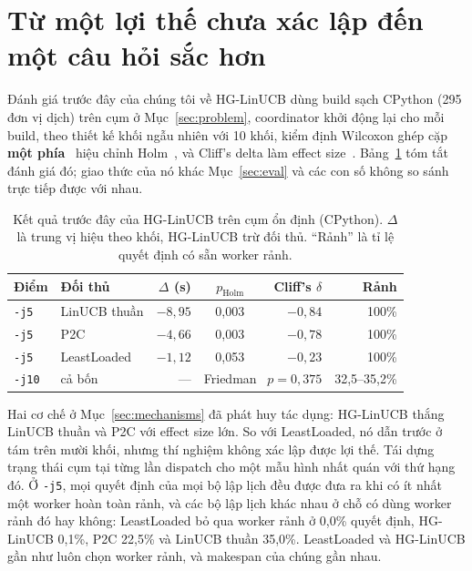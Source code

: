 \documentclass[final,5p,times,twocolumn]{elsarticle}
\begin{document}
\section{Từ một lợi thế chưa xác lập đến một câu hỏi sắc hơn}
\label{sec:question}

Đánh giá trước đây của chúng tôi về HG-LinUCB dùng build sạch CPython (295 đơn vị dịch) trên cụm ở Mục~\ref{sec:problem}, coordinator khởi động lại cho mỗi build, theo thiết kế khối ngẫu nhiên với 10 khối, kiểm định Wilcoxon ghép cặp \textbf{một phía}~\cite{wilcoxon1945} hiệu chỉnh Holm~\cite{holm1979}, và Cliff's delta làm effect size~\cite{cliff1993}. Bảng~\ref{tab:earlier} tóm tắt đánh giá đó; giao thức của nó khác Mục~\ref{sec:eval} và các con số không so sánh trực tiếp được với nhau.

\begin{table}[t]
\centering
\caption{Kết quả trước đây của HG-LinUCB trên cụm ổn định (CPython). $\Delta$ là trung vị hiệu theo khối, HG-LinUCB trừ đối thủ. ``Rảnh'' là tỉ lệ quyết định có sẵn worker rảnh.}
\label{tab:earlier}
\footnotesize
\setlength{\tabcolsep}{3pt}
\begin{tabular}{llrrrr}
\toprule
Điểm & Đối thủ & $\Delta$ (s) & $p_{\text{Holm}}$ & Cliff's $\delta$ & Rảnh \\
\midrule
\texttt{-j5} & LinUCB thuần & $-8{,}95$ & 0,003 & $-0{,}84$ & 100\% \\
\texttt{-j5} & P2C & $-4{,}66$ & 0,003 & $-0{,}78$ & 100\% \\
\texttt{-j5} & LeastLoaded & $-1{,}12$ & 0,053 & $-0{,}23$ & 100\% \\
\texttt{-j10} & cả bốn & --- & \multicolumn{2}{l}{Friedman~\cite{friedman1937} $p=0{,}375$} & 32,5--35,2\% \\
\bottomrule
\end{tabular}
\end{table}

Hai cơ chế ở Mục~\ref{sec:mechanisms} đã phát huy tác dụng: HG-LinUCB thắng LinUCB thuần và P2C với effect size lớn. So với LeastLoaded, nó dẫn trước ở tám trên mười khối, nhưng thí nghiệm không xác lập được lợi thế. Tái dựng trạng thái cụm tại từng lần dispatch cho một mẫu hình nhất quán với thứ hạng đó. Ở \texttt{-j5}, mọi quyết định của mọi bộ lập lịch đều được đưa ra khi có ít nhất một worker hoàn toàn rảnh, và các bộ lập lịch khác nhau ở chỗ có dùng worker rảnh đó hay không: LeastLoaded bỏ qua worker rảnh ở 0,0\% quyết định, HG-LinUCB 0,1\%, P2C 22,5\% và LinUCB thuần 35,0\%. LeastLoaded và HG-LinUCB gần như luôn chọn worker rảnh, và makespan của chúng gần nhau.
\end{document}
